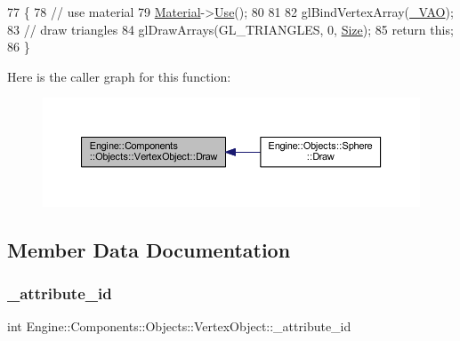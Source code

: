 \begin{DoxyCode}
77 \{
78     \textcolor{comment}{// use material}
79     \mbox{\hyperlink{classEngine_1_1Components_1_1Objects_1_1VertexObject_a86c1fced4cdc5e59a66a635390a17eca}{Material}}->\mbox{\hyperlink{classEngine_1_1Components_1_1Graphics_1_1Material_aef1dd6fbbf0268d4f3e6c371a2f1aa8d}{Use}}();
80 
81 
82     glBindVertexArray(\mbox{\hyperlink{classEngine_1_1Components_1_1Objects_1_1VertexObject_ae85ac9d5ded8f54d58feb7fb78e75130}{\_VAO}});
83     \textcolor{comment}{// draw triangles}
84     glDrawArrays(GL\_TRIANGLES, 0, \mbox{\hyperlink{classEngine_1_1Components_1_1Objects_1_1VertexObject_a13ec6e4a92520bdd1b33ad6de757cb92}{Size}});
85     \textcolor{keywordflow}{return} \textcolor{keyword}{this};
86 \}
\end{DoxyCode}
Here is the caller graph for this function\+:
\nopagebreak
\begin{figure}[H]
\begin{center}
\leavevmode
\includegraphics[width=350pt]{classEngine_1_1Components_1_1Objects_1_1VertexObject_a53a8f546ee082720579e2c33be6cedec_icgraph}
\end{center}
\end{figure}


\subsection{Member Data Documentation}
\mbox{\label{classEngine_1_1Components_1_1Objects_1_1VertexObject_a401aa1eb0254e57d8295c2287749eed5}} 
\subsubsection{\texorpdfstring{\+\_\+attribute\+\_\+id}{\_attribute\_id}}
{\footnotesize\ttfamily int Engine\+::\+Components\+::\+Objects\+::\+Vertex\+Object\+::\+\_\+attribute\+\_\+id\hspace{0.3cm}{\ttfamily [protected]}}



